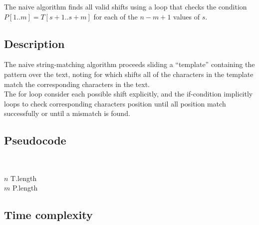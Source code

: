 \documentclass[11pt]{article}
\begin{document}
        The naive algorithm finds all valid shifts using a loop that checks the condition $P[1..m] = T[s+1..s+m]$ for each of the $n - m + 1$ values of $s$.

        \subsection{Description} \label{subsec:naive_description}

            The naive string-matching algorithm proceeds sliding a ``template'' containing the pattern over the text, noting for which shifts
            all of the characters in the template match the corresponding characters in the text. \\
            The for loop consider each possible shift explicitly, and the if-condition implicitly loops to check corresponding characters
            position until all position match successfully or until a mismatch is found.

        \subsection{Pseudocode} \label{subsec:naive_pseudocode}

            \begin{algorithm}[H] \label{alg:naive_string_matching_algorithm}
                \SetAlgoLined
                \vspace{0.5em}
                 \\
                \vspace{0.5em}

                    $n$ \leftarrow T.length\; \\
                    $m$ \leftarrow P.length\; \\

            \end{algorithm}

        \subsection{Time complexity} \label{subsec:naive_time_complexity}
\end{document}
